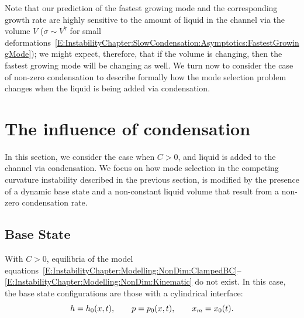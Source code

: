 Note that our prediction of the fastest growing mode and the corresponding growth rate are highly sensitive to the amount of liquid in the channel via the volume $V$ ($\sigma \sim V^7$ for small deformations~\eqref{E:InstabilityChapter:SlowCondensation:Asymptotics:FastestGrowingMode}); we might expect, therefore, that if the volume is changing, then the fastest growing mode will be changing as well. We turn now to consider the case of non-zero condensation to describe formally how the mode selection problem changes when the liquid is being added via condensation.

\section{The influence of condensation}
In this section, we consider the case when $C>0$, and liquid is added to the channel via condensation. We focus on how mode selection in the competing curvature instability described in the previous section, is modified by the presence of a dynamic base state and a non-constant liquid volume that result from a non-zero condensation rate.

\subsection{Base State}
With $C>0$, equilibria of the model equations~\eqref{E:InstabilityChapter:Modelling:NonDim:ClampedBC}--\eqref{E:InstabilityChapter:Modelling:NonDim:Kinematic} do not exist. In this case, the base state configurations are those with a cylindrical interface:
\begin{equation}\label{E:InstabilityChapter:BaseState:FlatInterface:FlatAnsatz}
h = h_0(x,t), \qquad p = p_0(x,t), \qquad x_m  = x_0(t).
\end{equation}

